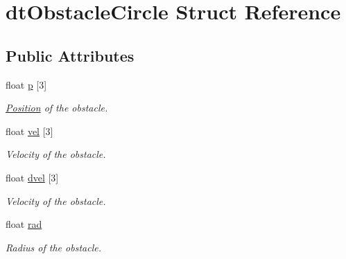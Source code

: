 \hypertarget{structdtObstacleCircle}{}\section{dt\+Obstacle\+Circle Struct Reference}
\label{structdtObstacleCircle}
\subsection*{Public Attributes}
\begin{DoxyCompactItemize}
\item 
\mbox{\label{structdtObstacleCircle_ad7214004b5184c2c834613fada7c6a0d}} 
float \hyperlink{structdtObstacleCircle_ad7214004b5184c2c834613fada7c6a0d}{p} \mbox{[}3\mbox{]}
\begin{DoxyCompactList}\small\item\em \hyperlink{structPosition}{Position} of the obstacle. \end{DoxyCompactList}\item 
\mbox{\label{structdtObstacleCircle_a6a505b7831f83bd04f9a93fc34ac91c2}} 
float \hyperlink{structdtObstacleCircle_a6a505b7831f83bd04f9a93fc34ac91c2}{vel} \mbox{[}3\mbox{]}
\begin{DoxyCompactList}\small\item\em Velocity of the obstacle. \end{DoxyCompactList}\item 
\mbox{\label{structdtObstacleCircle_a5b0260d07f8ef236c7a902e415fc7f7b}} 
float \hyperlink{structdtObstacleCircle_a5b0260d07f8ef236c7a902e415fc7f7b}{dvel} \mbox{[}3\mbox{]}
\begin{DoxyCompactList}\small\item\em Velocity of the obstacle. \end{DoxyCompactList}\item 
\mbox{\label{structdtObstacleCircle_ae666389d33d7316c1e4e303b13871adc}} 
float \hyperlink{structdtObstacleCircle_ae666389d33d7316c1e4e303b13871adc}{rad}
\begin{DoxyCompactList}\small\item\em Radius of the obstacle. \end{DoxyCompactList}\item 

\end{DoxyCompactItemize}
